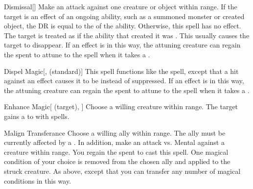 \lowercase{\hypertarget{spell:Dismissal}{}}\label{spell:Dismissal}
\begin{freeability}[\nth{2}]{\hypertarget{spell:Dismissal}{Dismissal}}[]
Make an attack against one creature or object within \rngmed range.
If the target is an effect of an ongoing  ability, such as a summoned monster or created object, the DR is equal to the  of the ability.
Otherwise, this spell has no effect.
\hit The target is treated as if the ability that created it was .
This usually causes the target to disappear.
If an  effect is  in this way,
the attuning creature can regain the  spent to attune to the spell when it takes a .
\end{freeability}
\vspace{0.25em}



\lowercase{\hypertarget{spell:Dispel Magic}{}}\label{spell:Dispel Magic}
\begin{freeability}[\nth{2}]{\hypertarget{spell:Dispel Magic}{Dispel Magic}}[,  (standard)]
This spell functions like the  spell, except that a hit against an effect causes it to be  instead of suppressed.
If an  effect is  in this way,
the attuning creature can regain the  spent to attune to the spell when it takes a .
\end{freeability}
\vspace{0.25em}



\lowercase{\hypertarget{spell:Enhance Magic}{}}\label{spell:Enhance Magic}
\begin{attuneability}[\nth{2}]{\hypertarget{spell:Enhance Magic}{Enhance Magic}}[ (target), ]
Choose a willing creature within \rngmed range.
The target gains a   to  with spells.
\end{attuneability}
\vspace{0.25em}



\lowercase{\hypertarget{spell:Malign Transferance}{}}\label{spell:Malign Transferance}
\begin{freeability}[\nth{2}]{\hypertarget{spell:Malign Transferance}{Malign Transferance}}
Choose a willing ally within \rngmed range.
The ally must be currently affected by a  .
In addition, make an attack vs. Mental against a creature within \rngmed range.
\miss You regain the  spent to cast this spell.
\hit One magical condition of your choice is removed from the chosen ally and applied to the struck creature.
\crit As above, except that you can transfer any number of magical conditions in this way.
\end{freeability}
\vspace{0.25em}



